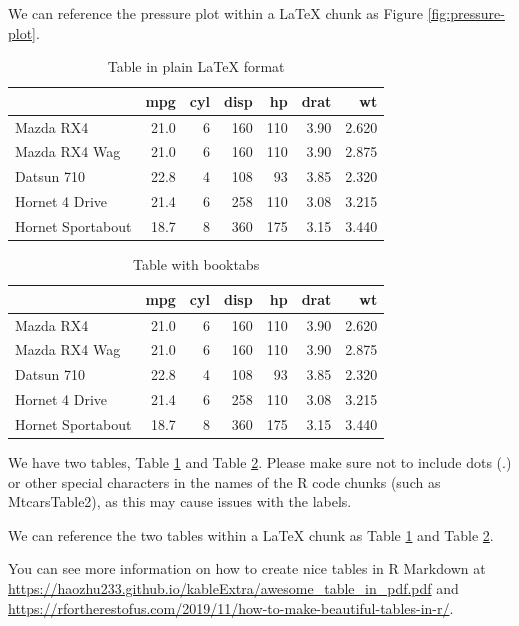 \documentclass[
  11pt,
  twoside,
  11pt]{article}
\numberwithin{Theorem}{section}
\numberwithin{Definition}{section}
\numberwithin{Lemma}{section}
\numberwithin{Algorithm}{section}
\numberwithin{equation}{section}
\begin{document}
We can reference the pressure plot within a LaTeX chunk as Figure \ref{fig:pressure-plot}.

\begin{table}

\caption{\label{tab:MtcarsTable1}Table in plain LaTeX format}
\centering
\begin{tabular}[t]{l|r|r|r|r|r|r}
\hline
  & mpg & cyl & disp & hp & drat & wt\\
\hline
Mazda RX4 & 21.0 & 6 & 160 & 110 & 3.90 & 2.620\\
\hline
Mazda RX4 Wag & 21.0 & 6 & 160 & 110 & 3.90 & 2.875\\
\hline
Datsun 710 & 22.8 & 4 & 108 & 93 & 3.85 & 2.320\\
\hline
Hornet 4 Drive & 21.4 & 6 & 258 & 110 & 3.08 & 3.215\\
\hline
Hornet Sportabout & 18.7 & 8 & 360 & 175 & 3.15 & 3.440\\
\hline
\end{tabular}
\end{table}

\begin{table}

\caption{\label{tab:MtcarsTable2}Table with booktabs}
\centering
\begin{tabular}[t]{lrrrrrr}
\toprule
  & mpg & cyl & disp & hp & drat & wt\\
\midrule
Mazda RX4 & 21.0 & 6 & 160 & 110 & 3.90 & 2.620\\
Mazda RX4 Wag & 21.0 & 6 & 160 & 110 & 3.90 & 2.875\\
Datsun 710 & 22.8 & 4 & 108 & 93 & 3.85 & 2.320\\
Hornet 4 Drive & 21.4 & 6 & 258 & 110 & 3.08 & 3.215\\
Hornet Sportabout & 18.7 & 8 & 360 & 175 & 3.15 & 3.440\\
\bottomrule
\end{tabular}
\end{table}

We have two tables, Table \ref{tab:MtcarsTable1} and Table \ref{tab:MtcarsTable2}. Please make sure not to include dots (.) or other special characters in the names of the R code chunks (such as MtcarsTable2), as this may cause issues with the labels.

We can reference the two tables within a LaTeX chunk as Table \ref{tab:MtcarsTable1} and Table \ref{tab:MtcarsTable2}.

You can see more information on how to create nice tables in R Markdown at \url{https://haozhu233.github.io/kableExtra/awesome_table_in_pdf.pdf} and \url{https://rfortherestofus.com/2019/11/how-to-make-beautiful-tables-in-r/}.
\end{document}
